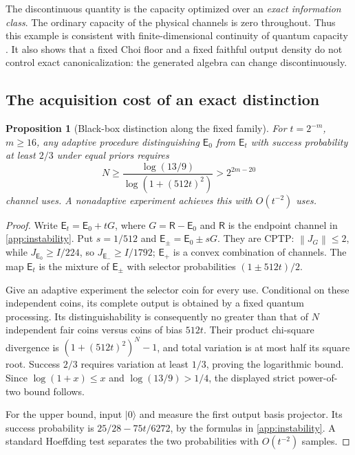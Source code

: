 \documentclass[11pt,reqno]{amsart}
\newtheorem{proposition}[theorem]{Proposition}
\theoremstyle{definition}
\theoremstyle{remark}
\numberwithin{equation}{section}
\newcommand{\E}{\mathsf E}
\newcommand{\R}{\mathsf R}
\newcommand{\norm}[1]{\left\lVert#1\right\rVert}
\begin{document}
The discontinuous quantity is the capacity optimized over an \emph{exact information class}. The ordinary capacity of the physical channels is zero throughout. Thus this example is consistent with finite-dimensional continuity of quantum capacity \cite[Corollary~14]{LeungSmith}. It also shows that a fixed Choi floor and a fixed faithful output density do not control exact canonicalization: the generated algebra can change discontinuously.

\subsection{The acquisition cost of an exact distinction}

\begin{proposition}[Black-box distinction along the fixed family]\label{prop:acquisition}
For $t=2^{-m}$, $m\ge16$, any adaptive procedure distinguishing $\E_0$ from $\E_t$ with success probability at least $2/3$ under equal priors requires
\[
 N\ge\frac{\log(13/9)}{\log(1+(512t)^2)}>2^{2m-20}
\]
channel uses. A nonadaptive experiment achieves this with $O(t^{-2})$ uses.
\end{proposition}

\begin{proof}
Write $\E_t=\E_0+tG$, where $G=\R-\E_0$ and $\R$ is the endpoint channel in \cref{app:instability}. Put $s=1/512$ and $\E_\pm=\E_0\pm sG$. They are CPTP: $\norm{J_G}\le2$, while $J_{\E_0}\ge I/224$, so $J_{\E_-}\ge I/1792$; $\E_+$ is a convex combination of channels. The map $\E_t$ is the mixture of $\E_\pm$ with selector probabilities $(1\pm512t)/2$.

Give an adaptive experiment the selector coin for every use. Conditional on these independent coins, its complete output is obtained by a fixed quantum processing. Its distinguishability is consequently no greater than that of $N$ independent fair coins versus coins of bias $512t$. Their product chi-square divergence is $(1+(512t)^2)^N-1$, and total variation is at most half its square root. Success $2/3$ requires variation at least $1/3$, proving the logarithmic bound. Since $\log(1+x)\le x$ and $\log(13/9)>1/4$, the displayed strict power-of-two bound follows.

For the upper bound, input $|0\rangle$ and measure the first output basis projector. Its success probability is $25/28-75t/6272$, by the formulas in \cref{app:instability}. A standard Hoeffding test separates the two probabilities with $O(t^{-2})$ samples.
\end{proof}
\end{document}

